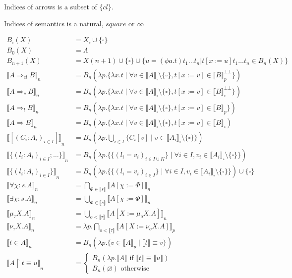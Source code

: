 \documentclass[oneside,a4]{book}
\renewcommand{\emptyset}{\varnothing}
\newcommand{\sem}[1]{\ensuremath{\llbracket #1 \rrbracket}}
\begin{document}
Indices of arrows is a subset of $\{cl\}$.

Indices of semantics is a natural, $square$ or $\infty$

  \begin{align*}
    B_\square(X) &= X_\square \cup \{\square\} \\
    B_0(X) &= \Lambda     \\
    B_{n+1}(X) &= X(n+1) \cup \{\square\} \cup \{ u = (\phi a.t) t_1 \dots t_n |
                                t[x:=u] t_1 \dots t_n \in B_n(X)\} \\
    \sem{A \Rightarrow_{cl} B}_n &=
      B_n(\lambda p. \{\lambda x.t \;|\; \forall v \in \sem{A}_\square \setminus
      \{\square\},
      t[x := v] \in \sem{B}_p^{\bot\bot}\})\\
    \sem{A \Rightarrow_{c} B}_n &=
      B_n(\lambda p. \{\lambda x.t \;|\; \forall v \in \sem{A}_\square \setminus
      \{\square\},
      t[x := v] \in \sem{B}_\square^{\bot\bot}\})\\
    \sem{A \Rightarrow_{l} B}_n &=
      B_n(\lambda p. \{\lambda x.t \;|\; \forall v \in \sem{A}_\square \setminus
      \{\square\},
      t[x := v] \in \sem{B}_p\})\\
    \sem{A \Rightarrow B}_n &=
      B_n(\lambda p. \{\lambda x.t \;|\; \forall v \in \sem{A}_\square \setminus
      \{\square\},
       t[x := v] \in \sem{B}_\square)\\
    \sem{[(C_i : A_i)_{i \in I}]}_n
      &=   B_n(\lambda p. \bigcup_{i \in I} \{C_i[v] \;|\; v \in \sem{A_i}_\square
            \setminus \{\square\}\})\\
    \sem{\{(l_i : A_i)_{i \in I}; \dots\}}_n
      &= B_n(\lambda p. \{\{(l_i = v_i)_{i \in I \cup K}\} \;|\; \forall i \in I, v_i \in \sem{A_i}_\square
           \setminus \{\square\}\})\\
    \sem{\{(l_i : A_i)_{i \in I}\}}_n
      &= B_n(\lambda p. \{\{(l_i = v_i)_{i \in I}\} \;|\; \forall i \in I, v_i \in \sem{A_i}_\square
           \setminus \{\square\}\}) \cup \{\square\}\\
    \sem{\forall \chi:s.A}_n
      &= \bigcap_{\Phi \in \sem{s}}
           \sem{A[\chi := \Phi]}_n\\
    \sem{\exists \chi:s.A}_n
      &= \bigcup_{\Phi \in \sem{s}}
           \sem{A[\chi := \Phi]}_n\\
    \sem{\mu_\tau X.A}_n
      &=  \bigcup_{o < \sem{\tau}}
            \sem{A[X := \mu_o X.A]}_n\\
    \sem{\nu_\tau X.A}_n
      &= \lambda p. \bigcap_{o < \sem{\tau}}
            \sem{A[X := \nu_o X.A]}_p\\
    \sem{t \in A}_n
      &= B_n(\lambda p. \{v \in \sem{A}_p \;|\; \sem{t}
      \equiv v\})\\
    \sem{A \restriction t \equiv u}_n
       &= \begin{cases}
           B_n(\lambda p. \sem{A} \text{ if } \sem{t}
             \equiv \sem{u})\\
           B_n(\emptyset) \text{ otherwise}
    \end{cases}
  \end{align*}
\end{document}
